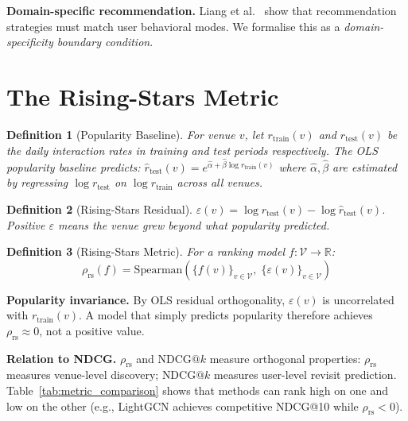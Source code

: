 \documentclass{article}
\newtheorem{definition}{Definition}
\begin{document}
\textbf{Domain-specific recommendation.}
Liang et al.~\cite{liang2016modeling} show that recommendation strategies
must match user behavioral modes.
We formalise this as a \emph{domain-specificity boundary condition}.

\section{The Rising-Stars Metric}
\label{sec:metric}

\begin{definition}[Popularity Baseline]
For venue $v$, let $r_{\text{train}}(v)$ and $r_{\text{test}}(v)$ be the
daily interaction rates in training and test periods respectively.
The OLS popularity baseline predicts:
$\hat{r}_{\text{test}}(v) = e^{\hat{\alpha} + \hat{\beta} \log r_{\text{train}}(v)}$
where $\hat{\alpha}, \hat{\beta}$ are estimated by regressing
$\log r_{\text{test}}$ on $\log r_{\text{train}}$ across all venues.
\end{definition}

\begin{definition}[Rising-Stars Residual]
$\varepsilon(v) = \log r_{\text{test}}(v) - \log \hat{r}_{\text{test}}(v)$.
Positive $\varepsilon$ means the venue grew \emph{beyond} what popularity
predicted.
\end{definition}

\begin{definition}[Rising-Stars Metric]
For a ranking model $f : \mathcal{V} \to \mathbb{R}$:
\begin{equation}
  \rho_{\text{rs}}(f) = \mathrm{Spearman}\!\left(
    \{f(v)\}_{v \in \mathcal{V}},\; \{\varepsilon(v)\}_{v \in \mathcal{V}}
  \right)
\end{equation}
\end{definition}

\noindent
\textbf{Popularity invariance.} By OLS residual orthogonality,
$\varepsilon(v)$ is uncorrelated with $r_{\text{train}}(v)$.
A model that simply predicts popularity therefore achieves
$\rho_{\text{rs}} \approx 0$, not a positive value.

\noindent
\textbf{Relation to NDCG.} $\rho_{\text{rs}}$ and $\text{NDCG}@k$ measure
orthogonal properties: $\rho_{\text{rs}}$ measures venue-level discovery;
$\text{NDCG}@k$ measures user-level revisit prediction.
Table~\ref{tab:metric_comparison} shows that methods can rank high on one
and low on the other (e.g., LightGCN achieves competitive NDCG@10 while
$\rho_{\text{rs}} < 0$).
\end{document}
